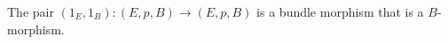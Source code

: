 The pair $(1_E, 1_B): (E, p, B) \rightarrow (E, p, B)$ is a bundle morphism that is a $B$-morphism.
